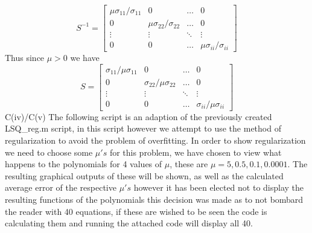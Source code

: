 \documentclass{report}
\begin{document}
\begin{equation}
    S^{-1}=\begin{bmatrix}
    \mu\sigma_{11}/\sigma_{11} & 0  & \dots  & 0 \\
    0 & \mu\sigma_{22}/\sigma_{22}  & \dots  & 0 \\
    \vdots & \vdots & \ddots & \vdots \\
    0 & 0 & \dots  & \mu\sigma_{ii}/\sigma_{ii}
\end{bmatrix}
\end{equation}
Thus since $\mu>0$ we have
\begin{equation}
    S=\begin{bmatrix}
   \sigma_{11}/ \mu\sigma_{11} & 0 & \dots  & 0 \\
    0 & \sigma_{22}/\mu\sigma_{22} & \dots  & 0 \\
    \vdots & \vdots & \ddots & \vdots \\
    0 & 0  & \dots  & \sigma_{ii}/\mu\sigma_{ii}
\end{bmatrix}
\end{equation}
\clearpage
\noindent C(iv)/C(v)
\newline
\indent The following script is an adaption of the previously created LSQ\_reg.m script, in this script however we attempt to use the method of regularization to avoid the problem of overfitting. In order to show regularization we need to choose some $\mu's$ for this problem, we have chosen to view what happens to the polynomials for 4 values of $\mu$, these are $\mu=5,0.5,0.1,0.0001$. The resulting graphical outputs of these will be shown, as well as the calculated average error of the respective $\mu's$ however it has been elected not to display the resulting functions of the polynomials this decision was made as to not bombard the reader with 40 equations, if these are wished to be seen the code is calculating them and running the attached code will display all 40.
\newline
\newline
\newline
\end{document}
